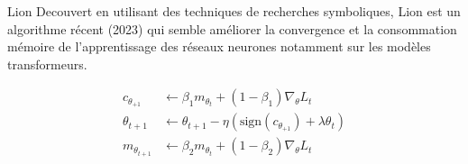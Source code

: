 \begin{frame}{Lion}
  Decouvert en utilisant des techniques de recherches symboliques, \alert{Lion} est un algorithme récent (2023) qui semble améliorer la convergence et la consommation mémoire de l'apprentissage des réseaux neurones notamment sur les modèles transformeurs.

  \begin{align*}
    c_{\theta_{+1}} &\leftarrow \beta_1 m_{\theta_t} + (1 - \beta_1)\nabla_\theta L_{t} \\
    \theta_{t+1} &\leftarrow \theta_{t+1} - \eta(\text{sign}(c_{\theta_{+1}}) + \lambda\theta_{t}) \\
    m_{\theta_{t+1}} &\leftarrow \beta_2 m_{\theta_{t}} + (1 - \beta_2)\nabla_\theta L_{t} \\
  \end{align*}
\end{frame}